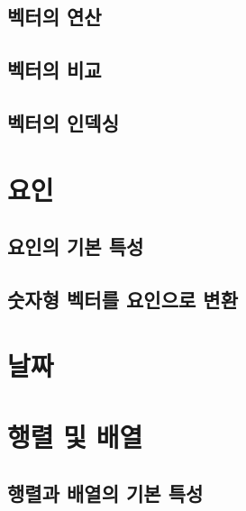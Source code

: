 \documentclass[
]{book}
\begin{document}
\hypertarget{uxbca1uxd130uxc758-uxc5f0uxc0b0}{%
\subsection{벡터의 연산}\label{uxbca1uxd130uxc758-uxc5f0uxc0b0}}

\hypertarget{vector-compare}{%
\subsection{벡터의 비교}\label{vector-compare}}

\hypertarget{uxbca1uxd130uxc758-uxc778uxb371uxc2f1}{%
\subsection{벡터의 인덱싱}\label{uxbca1uxd130uxc758-uxc778uxb371uxc2f1}}

\hypertarget{uxc694uxc778}{%
\section{요인}\label{uxc694uxc778}}

\hypertarget{uxc694uxc778uxc758-uxae30uxbcf8-uxd2b9uxc131}{%
\subsection{요인의 기본 특성}\label{uxc694uxc778uxc758-uxae30uxbcf8-uxd2b9uxc131}}

\hypertarget{uxc22buxc790uxd615-uxbca1uxd130uxb97c-uxc694uxc778uxc73cuxb85c-uxbcc0uxd658}{%
\subsection{숫자형 벡터를 요인으로 변환}\label{uxc22buxc790uxd615-uxbca1uxd130uxb97c-uxc694uxc778uxc73cuxb85c-uxbcc0uxd658}}

\hypertarget{uxb0a0uxc9dc}{%
\section{날짜}\label{uxb0a0uxc9dc}}

\hypertarget{uxd589uxb82c-uxbc0f-uxbc30uxc5f4}{%
\section{행렬 및 배열}\label{uxd589uxb82c-uxbc0f-uxbc30uxc5f4}}

\hypertarget{uxd589uxb82cuxacfc-uxbc30uxc5f4uxc758-uxae30uxbcf8-uxd2b9uxc131}{%
\subsection{행렬과 배열의 기본 특성}\label{uxd589uxb82cuxacfc-uxbc30uxc5f4uxc758-uxae30uxbcf8-uxd2b9uxc131}}
\end{document}
